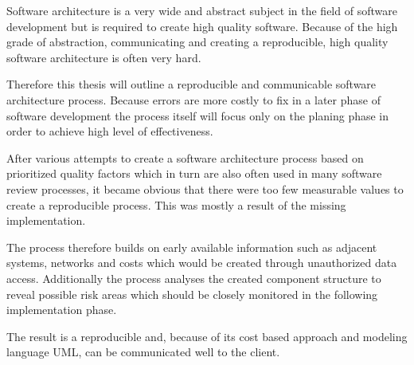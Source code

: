 Software architecture is a very wide and abstract subject in the field of software development but is required to create high quality software. Because of the high grade of abstraction, communicating and creating a reproducible, high quality software architecture is often very hard.

Therefore this thesis will outline a reproducible and communicable software architecture process. Because errors are more costly to fix in a later phase of software development the process itself will focus only on the planing phase in order to achieve high level of effectiveness.

After various attempts to create a software architecture process based on prioritized quality factors which in turn are also often used in many software review processes, it became obvious that there were too few measurable values to create a reproducible process. This was mostly a result of the missing implementation.

The process therefore builds on early available information such as adjacent systems, networks and costs which would be created through unauthorized data access. Additionally the process analyses the created component structure to reveal possible risk areas which should be closely monitored in the following implementation phase.

The result is a reproducible and, because of its cost based approach and modeling language UML, can be communicated well to the client.